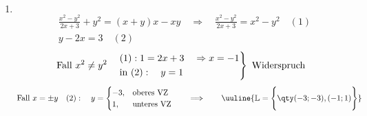 \begin{enumerate}[label=(\alph*)]
    \item $~$\\[-1.45cm]
    \begin{align}
        &\frac{x^2-y^2}{2x+3}+y^2=(x+y)x-xy \quad \Rightarrow \quad \frac{x^2 -y^2}{2x+3} = x^2 - y^2\quad(1) \\
        &y-2x=3 \quad (2)
    \end{align}
    \begin{align}
        \text{Fall } x^2 \neq y^2 \quad
        \begin{rcases}
            (1): 1=2x+3 \quad \Rightarrow x=-1 \\
            \text{in }(2): \quad y=1
        \end{rcases} \text{ Widerspruch}
    \end{align}
    \begin{align}
        \text{Fall } x = \pm y \quad (2): \quad y=
        \begin{cases}
            -3, &\text{oberes VZ}\\
            1, &\text{unteres VZ}
        \end{cases} \qquad \Longrightarrow \qquad \uuline{\mathbb{L} = \Bigg\{\qty(-3;-3),(-1;1)\Bigg\}}
    \end{align}
\end{enumerate}

\newpage
